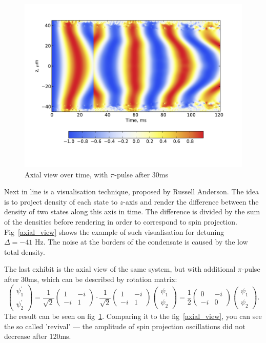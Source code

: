 \documentclass[12pt,notitlepage]{report}
\begin{document}
\begin{figure}
\includegraphics[width=4.5in]{axial_pi_pulse.pdf}
\caption{Axial view over time, with $\pi$-pulse after 30ms}
\label{axial_pi_pulse}
\end{figure}

Next in line is a visualisation technique, proposed by Russell Anderson.
The idea is to project density of each state to $z$-axis
and render the difference between the density of two states along this axis in time.
The difference is divided by the sum of the densities before rendering in order to correspond to spin projection.
Fig~\ref{axial_view} shows the example of such visualisation for detuning $\Delta = -41 \textrm{ Hz}$.
The noise at the borders of the condensate is caused by the low total density.

The last exhibit is the axial view of the same system, but with additional $\pi$-pulse after 30ms,
which can be described by rotation matrix:
\[
\begin{pmatrix}
	\psi^\prime_1 \\	\psi^\prime_2
\end{pmatrix} =
\frac{1}{\sqrt{2}} \begin{pmatrix}
	1 & -i \\ -i & 1
\end{pmatrix} \cdot
\frac{1}{\sqrt{2}} \begin{pmatrix}
	1 & -i \\ -i & 1
\end{pmatrix}
\begin{pmatrix}
	\psi_1 \\ \psi_2
\end{pmatrix} =
\frac{1}{2} \begin{pmatrix}
	0 & -i \\ -i & 0
\end{pmatrix}
\begin{pmatrix}
	\psi_1 \\ \psi_2
\end{pmatrix}.
\]
The result can be seen on fig~\ref{axial_pi_pulse}.
Comparing it to the fig~\ref{axial_view}, you can see the so called 'revival' ---
the amplitude of spin projection oscillations did not decrease after 120ms.



\end{document}
